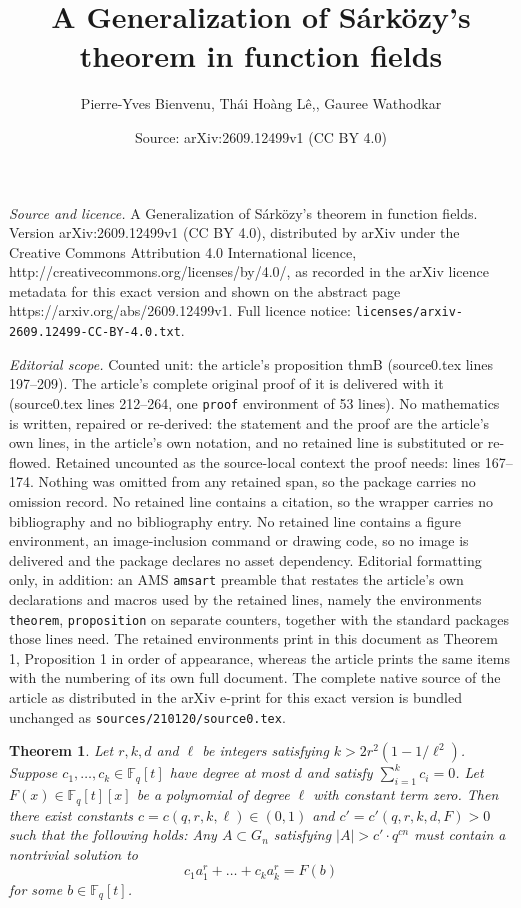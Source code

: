 \documentclass[10pt,a4paper]{amsart}
\title{A Generalization of S\'ark\"ozy's theorem in function fields}
\author{Pierre-Yves Bienvenu, Th\'ai Ho\`ang L\^e,, Gauree Wathodkar}
\date{Source: arXiv:2609.12499v1 (CC BY 4.0)}
\newtheorem{theorem}{Theorem}
\newcommand\Fq{{\mathbb{F}_q}}
\begin{document}
\maketitle

\noindent\emph{Source and licence.} A Generalization of S\'ark\"ozy's theorem in function fields. Version arXiv:2609.12499v1 (CC BY 4.0), distributed by arXiv under the Creative Commons Attribution 4.0 International licence, http://creativecommons.org/licenses/by/4.0/, as recorded in the arXiv licence metadata for this exact version and shown on the abstract page https://arxiv.org/abs/2609.12499v1. Full licence notice: \texttt{licenses/arxiv-2609.12499-CC-BY-4.0.txt}.\par\smallskip

\noindent\textit{Editorial scope.} Counted unit: the article's proposition thmB (source0.tex lines 197--209). The article's complete original proof of it is delivered with it (source0.tex lines 212--264, one \texttt{proof} environment of 53 lines). No mathematics is written, repaired or re-derived: the statement and the proof are the article's own lines, in the article's own notation, and no retained line is substituted or re-flowed.  Retained uncounted as the source-local context the proof needs: lines 167--174.  Nothing was omitted from any retained span, so the package carries no omission record.  No retained line contains a citation, so the wrapper carries no bibliography and no bibliography entry.  No retained line contains a figure environment, an image-inclusion command or drawing code, so no image is delivered and the package declares no asset dependency.  Editorial formatting only, in addition: an AMS \texttt{amsart} preamble that restates the article's own declarations and macros used by the retained lines, namely the environments \texttt{theorem}, \texttt{proposition} on separate counters, together with the standard packages those lines need.  The retained environments print in this document as Theorem 1, Proposition 1 in order of appearance, whereas the article prints the same items with the numbering of its own full document.  The complete native source of the article as distributed in the arXiv e-print for this exact version is bundled unchanged as \texttt{sources/210120/source0.tex}.
\begin{theorem}\label{thmA}
	Let $r, k, d$ and $\ell$ be integers satisfying $k>2r^2 (1-1/\ell^2)$. Suppose $c_1,\dots , c_k\in \Fq[t]$ have degree at most $d$ and satisfy $\sum_{i=1}^{k}c_i=0$. Let $F(x) \in \Fq[t][x]$ be a polynomial of degree $\ell$ with constant term zero. 
 Then there exist constants $c = c(q,r, k ,\ell) \in (0,1)$ and $c'=c'(q,r,k,d,F)>0$ such that the following holds: Any $A\subset G_n$ satisfying $|A|> c' \cdot q^{cn} $ must contain a nontrivial solution to 
	\begin{equation}\label{ee}
		c_1 a_1^r+\dots +c_k a_k^r=F(b)
	\end{equation}
	for some $b\in \Fq[t]$.
\end{theorem}
\end{document}

